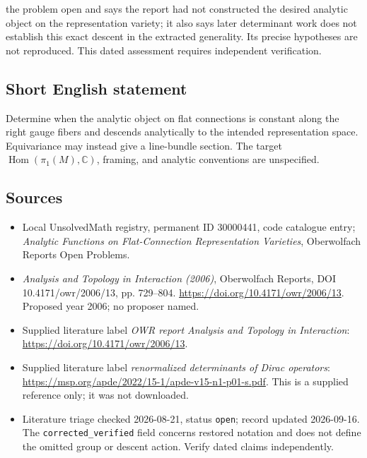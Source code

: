\documentclass[11pt]{article}
\newcommand{\C}{\mathbb{C}}
\begin{document}
the problem open and says the report had not constructed the desired analytic object on the representation variety; it also says later determinant work does not establish this exact descent in the extracted generality. Its precise hypotheses are not reproduced. This dated assessment requires independent verification.
\subsection{Short English statement}
Determine when the analytic object on flat connections is constant along the right gauge fibers and descends analytically to the intended representation space. Equivariance may instead give a line-bundle section. The target \(\operatorname{Hom}(\pi_1(M),\C)\), framing, and analytic conventions are unspecified.
\subsection{Sources}
\begin{itemize}\item Local UnsolvedMath registry, permanent ID 30000441, code catalogue entry; \emph{Analytic Functions on Flat-Connection Representation Varieties}, Oberwolfach Reports Open Problems.\item \emph{Analysis and Topology in Interaction (2006)}, Oberwolfach Reports, DOI 10.4171/owr/2006/13, pp. 729--804. \url{https://doi.org/10.4171/owr/2006/13}. Proposed year 2006; no proposer named.\item Supplied literature label \emph{OWR report Analysis and Topology in Interaction}: \url{https://doi.org/10.4171/owr/2006/13}.\item Supplied literature label \emph{renormalized determinants of Dirac operators}: \url{https://msp.org/apde/2022/15-1/apde-v15-n1-p01-s.pdf}. This is a supplied reference only; it was not downloaded.\item Literature triage checked 2026-08-21, status \texttt{open}; record updated 2026-09-16. The \texttt{corrected\_verified} field concerns restored notation and does not define the omitted group or descent action. Verify dated claims independently.\end{itemize}
\end{document}
